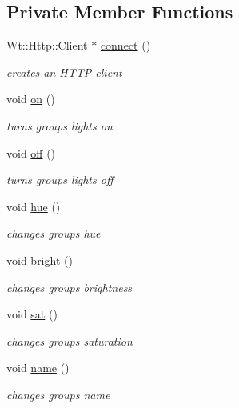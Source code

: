 \subsection*{Private Member Functions}
\begin{DoxyCompactItemize}
\item 
Wt\+::\+Http\+::\+Client $\ast$ \hyperlink{classSingleGroupsControlWidget_a36a607a09994c4c2db5ec8e214d2d5bc}{connect} ()
\begin{DoxyCompactList}\small\item\em creates an H\+T\+TP client \end{DoxyCompactList}\item 
void \hyperlink{classSingleGroupsControlWidget_ae1b39e4fd180f949cc6161a5837b659f}{on} ()
\begin{DoxyCompactList}\small\item\em turns group\textquotesingle{}s lights on \end{DoxyCompactList}\item 
void \hyperlink{classSingleGroupsControlWidget_a80dc0058c8bf19461f74a2efc6e40bdf}{off} ()
\begin{DoxyCompactList}\small\item\em turns group\textquotesingle{}s lights off \end{DoxyCompactList}\item 
void \hyperlink{classSingleGroupsControlWidget_a5da8fa2f328e6484b3cc3940ff09dd77}{hue} ()
\begin{DoxyCompactList}\small\item\em changes group\textquotesingle{}s hue \end{DoxyCompactList}\item 
void \hyperlink{classSingleGroupsControlWidget_abb243f17f45cd2f2d86147764f660b3e}{bright} ()
\begin{DoxyCompactList}\small\item\em changes group\textquotesingle{}s brightness \end{DoxyCompactList}\item 
void \hyperlink{classSingleGroupsControlWidget_aa1a21d1a2f3eeb2f9f73bb59dfaa7371}{sat} ()
\begin{DoxyCompactList}\small\item\em changes group\textquotesingle{}s saturation \end{DoxyCompactList}\item 
void \hyperlink{classSingleGroupsControlWidget_af9f44ae5837c9588dc4242e7a1ad4d7a}{name} ()
\begin{DoxyCompactList}\small\item\em changes group\textquotesingle{}s name \end{DoxyCompactList}\item 

\end{DoxyCompactItemize}
